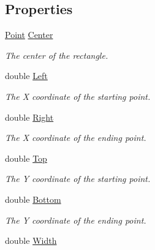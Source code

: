 \subsection*{Properties}
\begin{DoxyCompactItemize}
\item 
\mbox{\hyperlink{struct_s_g_l_1_1_point}{Point}} \mbox{\hyperlink{class_s_g_l_1_1_rectangle_a001d4f2a310309500dd359588f2248f5}{Center}}
\begin{DoxyCompactList}\small\item\em The center of the rectangle. \end{DoxyCompactList}\item 
double \mbox{\hyperlink{class_s_g_l_1_1_rectangle_a9c0e7dbf98fd9bf750e1c2ad66440a16}{Left}}
\begin{DoxyCompactList}\small\item\em The X coordinate of the starting point. \end{DoxyCompactList}\item 
double \mbox{\hyperlink{class_s_g_l_1_1_rectangle_aa0621bfad6df85f84708d730f232d721}{Right}}
\begin{DoxyCompactList}\small\item\em The X coordinate of the ending point. \end{DoxyCompactList}\item 
double \mbox{\hyperlink{class_s_g_l_1_1_rectangle_a4a6df15e33111ca4a17d54ea34babd37}{Top}}
\begin{DoxyCompactList}\small\item\em The Y coordinate of the starting point. \end{DoxyCompactList}\item 
double \mbox{\hyperlink{class_s_g_l_1_1_rectangle_a631dd02aad7a8628b5907c6bca22ce03}{Bottom}}
\begin{DoxyCompactList}\small\item\em The Y coordinate of the ending point. \end{DoxyCompactList}\item 
double \mbox{\hyperlink{class_s_g_l_1_1_rectangle_a717f64d0b1a88f2901ebb53bf5fdac72}{Width}}

\end{DoxyCompactItemize}
